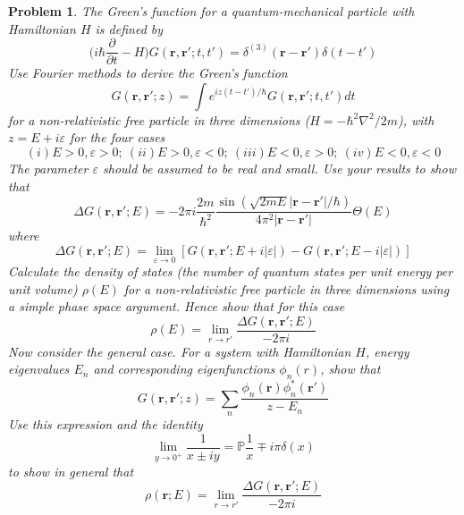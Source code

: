 \documentclass[a4paper]{article}
\theoremstyle{new}
\newtheorem{qns}{Problem}[section]
\begin{document}
\newpage
\begin{qns}
The Green’s function for a quantum-mechanical particle with Hamiltonian $H$ is defined by
$$\bigg(i\hbar\frac{\partial}{\partial t}-H\bigg)G(\mathbf{r},\mathbf{r'};t,t')=\delta^{(3)}(\mathbf{r}-\mathbf{r'})\delta(t-t')$$
Use Fourier methods to derive the Green’s function
$$G(\mathbf{r},\mathbf{r'};z)=\int e^{iz(t-t')/\hbar}G(\mathbf{r},\mathbf{r'};t,t')dt$$
for a non-relativistic free particle in three dimensions ($H=-\hbar^2\nabla^2/2m$), with $z=E+i\varepsilon$ for the four cases
$$(i)E>0,\varepsilon>0;~(ii)E>0,\varepsilon<0;~(iii)E<0,\varepsilon>0;~(iv)E<0,\varepsilon<0$$
The parameter $\varepsilon$ should be assumed to be real and small. Use your results to show that
$$\Delta G(\mathbf{r},\mathbf{r'};E)=-2\pi i\frac{2m}{\hbar^2}\frac{\sin(\sqrt{2mE}|\mathbf{r}-\mathbf{r'}|/\hbar)}{4\pi^2|\mathbf{r}-\mathbf{r'}|}\Theta(E)$$
where 
$$\Delta G(\mathbf{r},\mathbf{r'};E)=\lim_{\varepsilon\rightarrow 0}[G(\mathbf{r},\mathbf{r'};E+i|\varepsilon|)-G(\mathbf{r},\mathbf{r'};E-i|\varepsilon|)]$$
Calculate the density of states (the number of quantum states per unit energy per unit volume) $\rho(E)$ for a non-relativistic free particle in three dimensions using a simple phase space argument. Hence show that for this case
$$\rho(E)=\lim_{r\rightarrow r'}\frac{\Delta G(\mathbf{r},\mathbf{r'};E)}{-2\pi i}$$
Now consider the general case. For a system with Hamiltonian $H$, energy eigenvalues $E_n$ and corresponding eigenfunctions $\phi_n(r)$, show that
$$G(\mathbf{r},\mathbf{r'};z)=\sum_n\frac{\phi_n(\mathbf{r})\phi_n^*(\mathbf{r'})}{z-E_n}$$
Use this expression and the identity
$$\lim_{y\rightarrow 0^+}\frac{1}{x\pm iy}=\mathbb{P}\frac{1}{x}\mp i\pi\delta(x)$$
to show in general that
$$\rho(\mathbf{r};E)=\lim_{r\rightarrow r'}\frac{\Delta G(\mathbf{r},\mathbf{r'};E)}{-2\pi i}$$
\end{qns}
\end{document}
